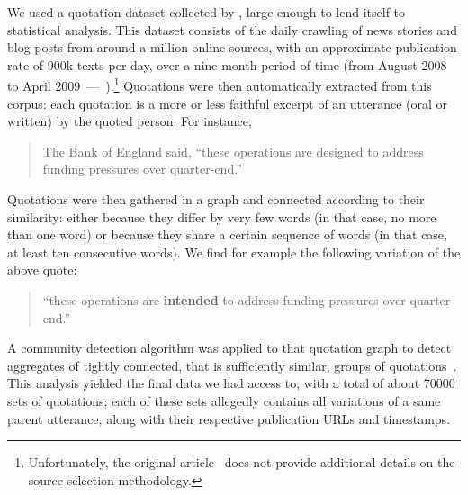 We used a quotation dataset collected by \citet{Leskovec09}, large enough to lend itself to statistical analysis.
This dataset consists of the daily crawling of news stories and blog posts from around a million online sources, with an approximate publication rate of 900k texts per day, over a nine-month period of time (from August 2008 to April 2009~---~\citealp{Leskovec09-url}).\footnote{Unfortunately, the original article~\citep{Leskovec09} does not provide additional details on the source selection methodology.}
Quotations were then automatically extracted from this corpus: each quotation is a more or less faithful excerpt of an utterance (oral or written) by the quoted person. For instance,
\begin{quote}
The Bank of England said, ``these operations are designed to address funding pressures over quarter-end.''
\end{quote}
Quotations were then gathered in a graph and connected according to their similarity: either because they differ by very few words (in that case, no more than one word) or because they share a certain sequence of words (in that case, at least ten consecutive words). We find for example the following variation of the above quote: \begin{quote}``these operations are \textbf{intended} to address funding pressures over quarter-end.''\end{quote}
A community detection algorithm was applied to that quotation graph to detect aggregates of tightly connected, that is sufficiently similar, groups of quotations~\citep[see][for more details]{Leskovec09}.
This analysis yielded the final data we had access to, with a total of about \num{70000} sets of quotations; each of these sets allegedly contains all variations of a same parent utterance, along with their respective publication URLs and timestamps.


